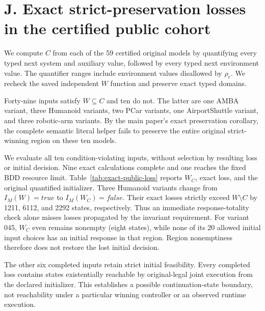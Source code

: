 \section*{J. Exact strict-preservation losses in the certified public cohort}\label{supp:preservation-loss}
We compute $C$ from each of the 59 certified original models by
quantifying every typed next system and auxiliary value, followed by
every typed next environment value. The quantifier ranges include
environment values disallowed by $\rho_e$. We recheck the saved
independent $W$ function and preserve exact typed domains.

Forty-nine inputs satisfy $W\subseteq C$ and ten do not. The latter are
one AMBA variant, three Humanoid variants, two PCar variants, one
AirportShuttle variant, and three robotic-arm variants.
By the main paper's exact preservation corollary, the complete semantic literal
helper fails to preserve the entire original strict-winning region
on these ten models.



We evaluate all ten condition-violating inputs, without selection by
resulting loss or initial decision.
Nine exact calculations complete and one reaches the fixed BDD resource
limit. Table~\ref{tab:exact-public-loss} reports $W_C$, exact loss, and
the original quantified initializer. Three Humanoid variants change from
$I_M(W)=\mathit{true}$ to $I_M(W_C)=\mathit{false}$.
Their exact losses strictly exceed $W\setminus C$ by 1211, 6112,
and 2292 states, respectively. Thus an immediate response-totality check
alone misses losses propagated by the invariant requirement.
For variant 045, $W_C$ even remains nonempty (eight states), while
none of its 20 allowed initial input choices has an initial response
in that region. Region nonemptiness therefore does not restore the
lost initial decision.

The other six completed inputs retain strict initial feasibility.
Every completed loss contains states existentially reachable by
original-legal joint execution from the declared initializer. This
establishes a possible continuation-state boundary, not reachability
under a particular winning controller or an observed runtime execution.

